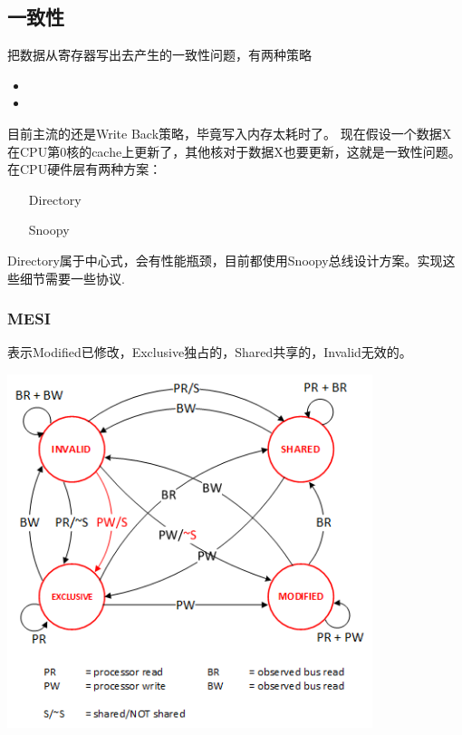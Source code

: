 \subsection{一致性}

把数据从寄存器写出去产生的一致性问题，有两种策略

\begin{itemize}
    \item {}
    \item {}
\end{itemize}

目前主流的还是Write Back策略，毕竟写入内存太耗时了。
现在假设一个数据X在CPU第0核的cache上更新了，其他核对于数据X也要更新，这就是一致性问题。
在CPU硬件层有两种方案：

\begin{itemize}
    \item [Directory] 
    \item [Snoopy] 
\end{itemize}

Directory属于中心式，会有性能瓶颈，目前都使用Snoopy总线设计方案。实现这些细节需要一些协议.

\subsubsection{MESI}

表示Modified已修改，Exclusive独占的，Shared共享的，Invalid无效的。

\begin{center}
    \includegraphics[width=0.8\textwidth]{images/MESI.png}
\end{center}

